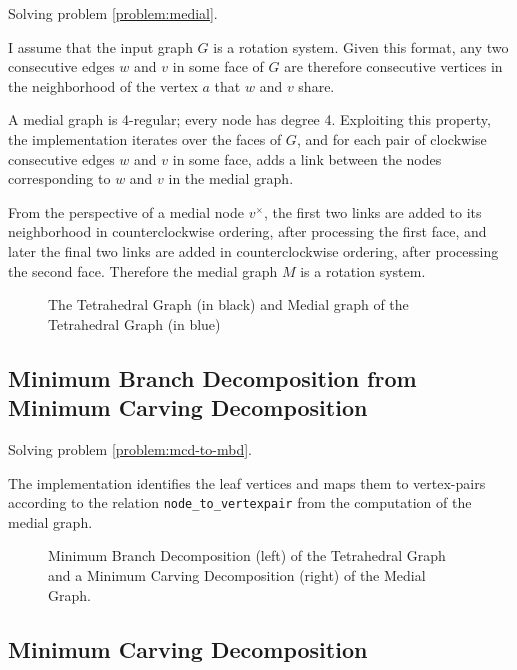 \documentclass{article}
\begin{document}
		Solving problem \ref{problem:medial}.

		I assume that the input graph $G$ is a rotation system. Given this format, any two consecutive edges $w$ and $v$ in some face of $G$ are therefore consecutive vertices in the neighborhood of the vertex $a$ that $w$ and $v$ share.

		A medial graph is 4-regular; every node has degree 4. Exploiting this property, the implementation iterates over the faces of $G$, and for each pair of clockwise consecutive edges $w$ and $v$ in some face, adds a link between the nodes corresponding to $w$ and $v$ in the medial graph.
		
		From the perspective of a medial node $v^\times$, the first two links are added to its neighborhood in counterclockwise ordering, after processing the first face, and later the final two links are added in counterclockwise ordering, after processing the second face. Therefore the medial graph $M$ is a rotation system.


		\begin{figure}[H]
			\centering
			
			\caption{The Tetrahedral Graph (in black) and Medial graph of the Tetrahedral Graph (in blue)}
			\label{fig:gmedial}
		\end{figure}

	\subsection{Minimum Branch Decomposition from Minimum Carving Decomposition}

		Solving problem \ref{problem:mcd-to-mbd}.

		The implementation identifies the leaf vertices and maps them to vertex-pairs according to the relation \texttt{node_to_vertexpair} from the computation of the medial graph.


		\begin{figure}[H]
			\centering
			
			
			\caption{Minimum Branch Decomposition (left) of the Tetrahedral Graph and a Minimum Carving Decomposition (right) of the Medial Graph.}
			\label{fig:m}
		\end{figure}
			
	\subsection{Minimum Carving Decomposition}
\end{document}
